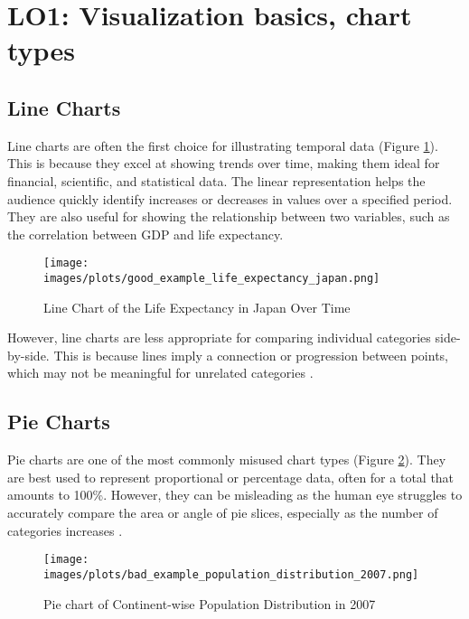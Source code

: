 \section{LO1: Visualization basics, chart types}

\subsection{Line Charts}

Line charts are often the first choice for illustrating temporal data (Figure \ref{fig:line_chart_good}). This is because they excel at showing trends over time, making them ideal for financial, scientific, and statistical data. The linear representation helps the audience quickly identify increases or decreases in values over a specified period. They are also useful for showing the relationship between two variables, such as the correlation between GDP and life expectancy.

\begin{figure}[h]
    \centering
    \texttt{[image: images/plots/good\_example\_life\_expectancy\_japan.png]} 
    \caption{Line Chart of the Life Expectancy in Japan Over Time}
    \label{fig:line_chart_good}
\end{figure}

However, line charts are less appropriate for comparing individual categories side-by-side. This is because lines imply a connection or progression between points, which may not be meaningful for unrelated categories \cite{fewNowYouSee2009}.

\subsection{Pie Charts}

Pie charts are one of the most commonly misused chart types (Figure \ref{fig:pie_chart_bad}). They are best used to represent proportional or percentage data, often for a total that amounts to 100\%. However, they can be misleading as the human eye struggles to accurately compare the area or angle of pie slices, especially as the number of categories increases \cite{tufteVisualDisplayQuantitative2015}.

\begin{figure}[h]
    \centering
    \texttt{[image: images/plots/bad\_example\_population\_distribution\_2007.png]} 
    \caption{Pie chart of Continent-wise Population Distribution in 2007}
    \label{fig:pie_chart_bad}
\end{figure}

